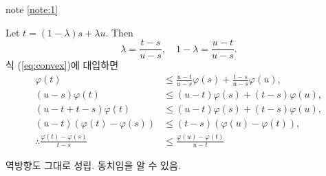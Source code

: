 \documentclass[11pt,reqno]{article}
\renewcommand{\(}{\left(}
\renewcommand{\)}{\right)}
\renewcommand{\[}{\left[}
\renewcommand{\]}{\right]}
\newenvironment{note}
  {\begin{tcolorbox}[
    colback=white, 
    colframe=gray!50, 
    boxrule=0.5pt,
    fontupper=\normalfont
  ]}
  {\end{tcolorbox}}
\begin{document}
\begin{note}
  note \ref{note:1}

  Let $t = (1-\lambda) s + \lambda u$. Then
  \begin{equation}
    \lambda = \frac{t-s}{u-s}, \quad 1 - \lambda = \frac{u-t}{u-s}.
  \end{equation}
  식 (\ref{eq:convex})에 대입하면
  \begin{align}
    \varphi (t) & \le \frac{u-t}{u-s} \varphi (s) + \frac{t-s}{u-s} \varphi (u), \\
    (u - s) \varphi (t) & \le (u - t) \varphi (s) + (t - s) \varphi (u), \\
    (u - t + t - s) \varphi (t) & \le (u - t) \varphi (s) + (t - s) \varphi (u), \\
    (u - t)(\varphi (t) - \varphi (s)) & \le (t - s) (\varphi (u) - \varphi (t)), \\
    \therefore \frac{\varphi(t) - \varphi(s)}{t - s} & \le \frac{\varphi(u) - \varphi(t)}{u - t}
  \end{align}
  
  역방향도 그대로 성립. 동치임을 알 수 있음.
\end{note}
\end{document}
